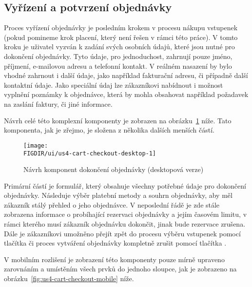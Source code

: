 \subsection{Vyřízení a potvrzení objednávky}
\label{subsec:narvh-ui-transformace-uzivatelskych-pribehu-vyrideni-a-potvrzeni-objednavky}
\userstorycheckout

Proces vyřízení objednávky je posledním krokem v procesu nákupu vstupenek (pokud pomineme krok placení, který není řešen v rámci této práce).
V tomto kroku je uživatel vyzván k zadání svých osobních údajů, které jsou nutné pro dokončení objednávky.
Tyto údaje, pro jednoduchost, zahrnují pouze jméno, příjmení, e-mailovou adresu a telefonní kontakt.
V reálném nasazení by bylo vhodné zahrnout i další údaje, jako například fakturační adresu, či případně další kontaktní údaje.
Jako speciální údaj lze zákazníkovi nabídnout i možnost vyplnění poznámky k objednávce, která by mohla obsahovat například požadavek na zaslání faktury, či jiné informace.

Návrh celé této komplexní komponenty je zobrazen na obrázku~\ref{fig:us4-cart-checkout-desktop} níže.
Tato komponenta, jak je zřejmo, je složena z několika dalších menších částí.

\begin{figure}[H]
    \centering
    \texttt{[image: \\FIGDIR/ui/us4-cart-checkout-desktop-1]}
    \caption{Návrh komponent dokončení objednávky (desktopová verze)}
    \label{fig:us4-cart-checkout-desktop}
\end{figure}

Primární částí je formulář, který obsahuje všechny potřebné údaje pro dokončení objednávky.
Následuje výběr platební metody a souhrn objednávky, aby měl zákazník stálý přehled o jeho objednávce.
V neposlední řádě je zde stále zobrazena informace o probíhající rezervaci objednávky a jejím časovém limitu, v rámci kterého musí zákazník objednávku dokončit, jinak bude rezervace zrušena.
Dále je zákazníkovi umožněno přejít zpět do procesu výběru vstupenek pomocí tlačítka  či proces vytváření objednávky kompletně zrušit pomocí tlačítka .

V mobilním rozlišení je zobrazení této komponenty pouze mírně upraveno zarovnáním a umístěním všech prvků do jednoho sloupce, jak je zobrazeno na obrázku~\ref{fig:us4-cart-checkout-mobile} níže.

